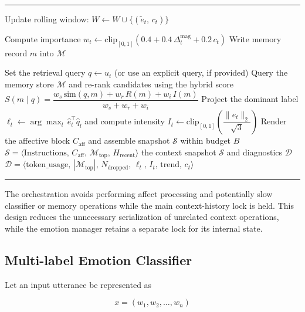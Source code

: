 \documentclass[graybox]{svmult}
\newenvironment{breakablealgorithm}
{%
    \par\medskip
    \refstepcounter{algorithm}%
    \hrule\vspace{2pt}%
    \renewcommand{\caption}[1]{%
        \noindent\textbf{Algorithm~\thealgorithm}\enspace ##1\par
        \vspace{2pt}\hrule\vspace{2pt}%
    }%
}
{%
    \vspace{2pt}\hrule
    \par\medskip
}
\begin{document}
\begin{breakablealgorithm}
\begin{algorithmic}[1]
    \State Update rolling window: $W \gets W \cup \{(\tilde{e}_t,\, c_t)\}$

        \State Compute importance $w_t \gets \text{clip}_{[0,1]}(0.4 + 0.4\,\Delta_t^{\text{mag}} + 0.2\,c_t)$
        \State Write memory record $m$ into $\mathcal{M}$
    \EndFor

    \State \label{line:retrieval}Set the retrieval query $q \gets u_t$ (or use an explicit query, if provided)
    \State Query the memory store $\mathcal{M}$ and re-rank candidates using the hybrid score
    \Statex \qquad $S(m \mid q) = \dfrac{w_s\,\text{sim}(q, m) + w_r\,R(m) + w_i\,I(m)}{w_s + w_r + w_i}$
    \State Project the dominant label $\ell_t \gets \arg\max_l\, \hat{e}_t^\top \hat{q}_l$ and compute intensity $I_t \gets \text{clip}_{[0,1]}\!\left(\dfrac{\|e_t\|_2}{\sqrt{3}}\right)$
    \State Render the affective block $C_{\text{aff}}$ and assemble snapshot $\mathcal{S}$ within budget $B$
    \Statex \qquad $\mathcal{S} = \langle \text{Instructions},\, C_{\text{aff}},\, \mathcal{M}_{\text{top}},\, H_{\text{recent}} \rangle$
    \State \Return the context snapshot $\mathcal{S}$ and diagnostics $\mathcal{D}$
    \Statex \qquad $\mathcal{D} = \langle \text{token\_usage},\,
    |\mathcal{M}_{\text{top}}|,\, N_{\text{dropped}},\, \ell_t,\, I_t,\,
    \text{trend},\, c_t \rangle$
\end{algorithmic}
\end{breakablealgorithm}



The orchestration avoids performing affect processing and potentially slow classifier or memory operations while the main context-history lock is held. This design reduces the unnecessary serialization of unrelated context operations, while the emotion manager retains a separate lock for its internal state.



\subsection{Multi-label Emotion Classifier}

Let an input utterance be represented as

\begin{equation}
x = (w_1,w_2,\ldots,w_n)
\end{equation}
\end{document}
